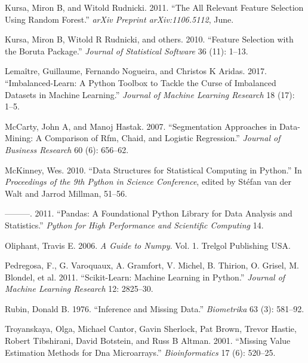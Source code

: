 \documentclass[
  11pt,
  a4paper,
  DIV=12,captions=tableheading,oneside,titlepage=firstiscover,abstracton]{scrreprt}
\begin{document}
\leavevmode\hypertarget{ref-kursa2011boruta}{}%
Kursa, Miron B, and Witold Rudnicki. 2011. ``The All Relevant Feature Selection Using Random Forest.'' \emph{arXiv Preprint arXiv:1106.5112}, June.

\leavevmode\hypertarget{ref-kursa2010boruta}{}%
Kursa, Miron B, Witold R Rudnicki, and others. 2010. ``Feature Selection with the Boruta Package.'' \emph{Journal of Statistical Software} 36 (11): 1--13.

\leavevmode\hypertarget{ref-lemaitre2017imblearn}{}%
Lemaître, Guillaume, Fernando Nogueira, and Christos K Aridas. 2017. ``Imbalanced-Learn: A Python Toolbox to Tackle the Curse of Imbalanced Datasets in Machine Learning.'' \emph{Journal of Machine Learning Research} 18 (17): 1--5.

\leavevmode\hypertarget{ref-MCCARTY2007656}{}%
McCarty, John A, and Manoj Hastak. 2007. ``Segmentation Approaches in Data-Mining: A Comparison of Rfm, Chaid, and Logistic Regression.'' \emph{Journal of Business Research} 60 (6): 656--62.

\leavevmode\hypertarget{ref-mckinney-proc-scipy-2010}{}%
McKinney, Wes. 2010. ``Data Structures for Statistical Computing in Python.'' In \emph{Proceedings of the 9th Python in Science Conference}, edited by Stéfan van der Walt and Jarrod Millman, 51--56.

\leavevmode\hypertarget{ref-mckinney2011pandas}{}%
---------. 2011. ``Pandas: A Foundational Python Library for Data Analysis and Statistics.'' \emph{Python for High Performance and Scientific Computing} 14.

\leavevmode\hypertarget{ref-oliphant2006guide}{}%
Oliphant, Travis E. 2006. \emph{A Guide to Numpy}. Vol. 1. Trelgol Publishing USA.

\leavevmode\hypertarget{ref-scikit-learn}{}%
Pedregosa, F., G. Varoquaux, A. Gramfort, V. Michel, B. Thirion, O. Grisel, M. Blondel, et al. 2011. ``Scikit-Learn: Machine Learning in Python.'' \emph{Journal of Machine Learning Research} 12: 2825--30.

\leavevmode\hypertarget{ref-rubin1976inference}{}%
Rubin, Donald B. 1976. ``Inference and Missing Data.'' \emph{Biometrika} 63 (3): 581--92.

\leavevmode\hypertarget{ref-troyanskaya2001missing}{}%
Troyanskaya, Olga, Michael Cantor, Gavin Sherlock, Pat Brown, Trevor Hastie, Robert Tibshirani, David Botstein, and Russ B Altman. 2001. ``Missing Value Estimation Methods for Dna Microarrays.'' \emph{Bioinformatics} 17 (6): 520--25.
\end{document}
